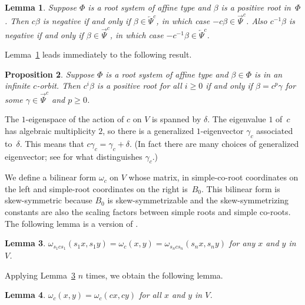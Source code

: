 \documentclass[10pt]{article}
\newtheorem{proposition}{Proposition}[section]
\newtheorem{lemma}[proposition]{Lemma}
\theoremstyle{definition}
\theoremstyle{remark}
\numberwithin{equation}{section}
\newcommand{\0}{{\mathbf{0}}}
\newcommand{\RSChar}{\Phi}
\newcommand{\RS}{\RSChar}
\newcommand{\TravInfChar}{\Psi}
\newcommand{\TravProj}[1]{\overrightarrow{\TravInfChar}^{#1}}
\newcommand{\TravInj}[1]{\overleftarrow{\TravInfChar}^{#1}}
\begin{document}
\begin{lemma}\label{c to pos}
Suppose $\RS$ is a root system of affine type and $\beta$ is a positive root in~$\RS$. 
Then $c\beta$ is negative if and only if $\beta\in\TravInj{c}$, in which case $-c\beta\in\TravProj{c}$.
Also $c^{-1}\beta$ is negative if and only if $\beta\in\TravProj{c}$, in which case $-c^{-1}\beta\in\TravInj{c}$.
\end{lemma}

Lemma~\ref{c to pos} leads immediately to the following result.
\begin{proposition}\label{who is pos}
Suppose $\RS$ is a root system of affine type and $\beta\in\RS$ is in an infinite $c$-orbit.
Then $c^i\beta$ is a positive root for all $i\ge0$ if and only if $\beta=c^p\gamma$ for some $\gamma\in\TravProj{c}$ and $p\ge0$.
\end{proposition}

The $1$-eigenspace of the action of $c$ on $V$ is spanned by $\delta$.
The eigenvalue $1$ of~$c$ has algebraic multiplicity $2$, so there is a generalized $1$-eigenvector $\gamma_c$ associated to~$\delta$.
This means that $c\gamma_c=\gamma_c+\delta$.
(In fact there are many choices of generalized eigenvector; see \cite[Proposition~3.1]{afforb} for what distinguishes $\gamma_c$.)

We define a bilinear form $\omega_c$ on $V$ whose matrix, in simple-co-root coordinates on the left and simple-root coordinates on the right is~$B_0$.
This bilinear form is skew-symmetric because $B_0$ is skew-symmetrizable and the skew-symmetrizing constants are also the scaling factors between simple roots and simple co-roots.
The following lemma is a version of \cite[Lemma~3.8]{typefree}.

\begin{lemma}\label{omega s}
$\omega_{s_1cs_1}(s_1x,s_1y)=\omega_c(x,y)=\omega_{s_ncs_n}(s_nx,s_ny)$ for any $x$ and $y$ in~$V$.
\end{lemma}

Applying Lemma~\ref{omega s} $n$ times, we obtain the following lemma.

\begin{lemma}\label{omega c}
$\omega_c(x,y)=\omega_c(cx,cy)$ for all $x$ and $y$ in $V$.
\end{lemma}
\end{document}
